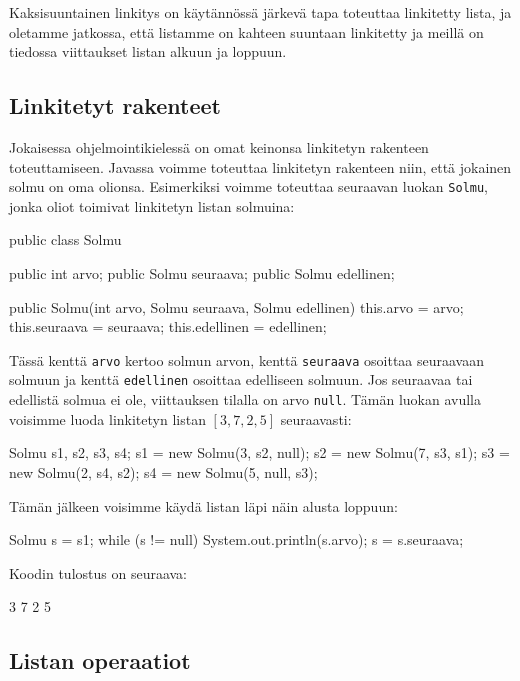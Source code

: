Kaksisuuntainen linkitys on käytännössä järkevä tapa toteuttaa
linkitetty lista, ja oletamme jatkossa, että listamme on
kahteen suuntaan linkitetty ja meillä on tiedossa viittaukset
listan alkuun ja loppuun.

\subsection{Linkitetyt rakenteet}

Jokaisessa ohjelmointikielessä on omat keinonsa
linkitetyn rakenteen toteuttamiseen.
Javassa voimme toteuttaa linkitetyn rakenteen niin,
että jokainen solmu on oma olionsa.
Esimerkiksi voimme toteuttaa seuraavan luokan \texttt{Solmu},
jonka oliot toimivat linkitetyn listan solmuina:

\begin{code}
public class Solmu {
    public int arvo;
    public Solmu seuraava;
    public Solmu edellinen;

    public Solmu(int arvo, Solmu seuraava, Solmu edellinen) {
        this.arvo = arvo;
        this.seuraava = seuraava;
        this.edellinen = edellinen;
    }
}
\end{code}

Tässä kenttä \texttt{arvo} kertoo solmun arvon,
kenttä \texttt{seuraava} osoittaa seuraavaan solmuun
ja kenttä \texttt{edellinen} osoittaa edelliseen solmuun.
Jos seuraavaa tai edellistä solmua ei ole,
viittauksen tilalla on arvo \texttt{null}.
Tämän luokan avulla voisimme luoda linkitetyn listan $[3,7,2,5]$
seuraavasti:

\begin{code}
Solmu s1, s2, s3, s4;
s1 = new Solmu(3, s2, null);
s2 = new Solmu(7, s3, s1);
s3 = new Solmu(2, s4, s2);
s4 = new Solmu(5, null, s3);
\end{code}

Tämän jälkeen voisimme käydä listan läpi näin alusta loppuun:

\begin{code}
Solmu s = s1;
while (s != null) {
    System.out.println(s.arvo);
    s = s.seuraava;
}
\end{code}

Koodin tulostus on seuraava:

\begin{code}
3
7
2
5
\end{code}

\subsection{Listan operaatiot}

